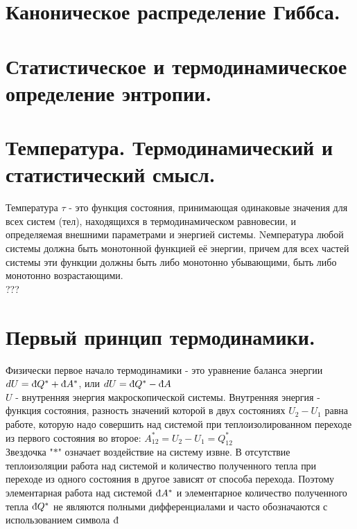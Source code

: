 \newcommand{\colontitulAutors}{astronom\_v\_cube,~edombek}
\newcommand{\colontitulYear}{2023}
\newcommand{\colontitulEducationalSubject}{Термодинамика и статистическая физика}
\newcommand{\colontitulTeacher}{Гавриленко В.Г.}




	\small
	\begin{multicols*}{2}

		\section{Каноническое распределение Гиббса.}
		
		\section{Статистическое и термодинамическое определение энтропии.}

		\section{Температура. Термодинамический и статистический смысл.}
		Температура $\tau$ - это функция состояния, принимающая одинаковые значения для всех систем (тел), находящихся в термодинамическом равновесии, и определяемая внешними параметрами и энергией системы. Nемпература любой системы должна быть монотонной функцией её энергии, причем для всех частей системы эти функции должны быть либо монотонно убывающими, быть либо монотонно возрастающими.\\
		???

		\section{Первый принцип термодинамики.}
		Физически первое начало термодинамики - это уравнение баланса энергии\\
		$dU = \text{\dj}Q^* + \text{\dj}A^*$, или $dU = \text{\dj}Q^* - \text{\dj}A$\\
		$U$ - внутренняя энергия макроскопической системы. Внутренняя энергия - функция состояния, разность значений которой в двух состояниях $U_2 - U_1$ равна работе, которую надо совершить над системой при теплоизолированном переходе из первого состояния во второе: $A^*_{12} = U_2 - U_1 = Q^*_{12}$\\
		Звездочка "$*$" означает воздействие на систему извне. В отсутствие теплоизоляции работа над системой и количество полученного тепла при переходе из одного состояния в другое зависят от способа перехода. Поэтому элементарная работа над системой $\text{\dj}A^*$ и элементарное количество полученного тепла $\text{\dj}Q^*$ не являются полными дифференциалами и часто обозначаются с использованием символа $\text{\dj}$


\end{multicols*}

